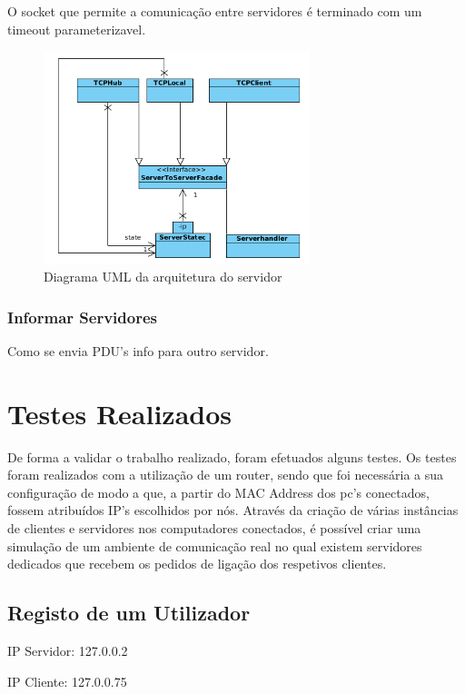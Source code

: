 \documentclass[runningheads,a4paper]{llncs}
\begin{document}
O socket que permite a comunicação entre servidores é terminado com um timeout parameterizavel.

\begin{figure}
\centering
\includegraphics[height=6.2cm]{facades.png}
\caption{Diagrama UML da arquitetura do servidor}
\label{fig:diagram-facades}
\end{figure}


\subsubsection{Informar Servidores}
Como se envia PDU’s info para outro servidor.


\section{Testes Realizados}

De forma a validar o trabalho realizado, foram efetuados alguns testes. Os testes foram realizados com a utilização de um router, sendo que foi necessária a sua configuração de modo a que, a partir do MAC Address dos pc’s conectados, fossem atribuídos IP’s escolhidos por nós. Através da criação de várias instâncias de clientes e servidores nos computadores conectados, é possível criar uma simulação de um ambiente de comunicação real no qual existem servidores dedicados que recebem os pedidos de ligação dos respetivos clientes.

\subsection{Registo de um Utilizador}

\begin{itemsize}

\item IP Servidor: 127.0.0.2
\item IP Cliente: 127.0.0.75

\end{itemsize}
\end{document}
